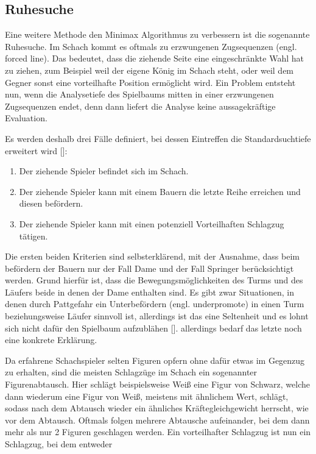 \subsection{Ruhesuche}

Eine weitere Methode den Minimax Algorithmus zu verbessern ist die sogenannte Ruhesuche.
Im Schach kommt es oftmals zu erzwungenen Zugsequenzen (engl. forced line).
Das bedeutet, dass die ziehende Seite eine eingeschränkte Wahl hat zu ziehen, zum Beispiel weil der eigene König im Schach steht, oder weil dem Gegner sonst eine vorteilhafte Position ermöglicht wird.
Ein Problem entsteht nun, wenn die Analysetiefe des Spielbaums mitten in einer erzwungenen Zugsequenzen endet, denn dann liefert die Analyse keine aussagekräftige Evaluation.

Es werden deshalb drei Fälle definiert, bei dessen Eintreffen die Standardsuchtiefe erweitert wird [\cite{Stuckardt}]:

\begin{enumerate}
    \item Der ziehende Spieler befindet sich im Schach.
    \item Der ziehende Spieler kann mit einem Bauern die letzte Reihe erreichen und diesen befördern.
    \item Der ziehende Spieler kann mit einen potenziell Vorteilhaften Schlagzug tätigen.
\end{enumerate}

Die ersten beiden Kriterien sind selbsterklärend, mit der Ausnahme, dass beim befördern der Bauern nur der Fall Dame und der Fall Springer berücksichtigt werden.
Grund hierfür ist, dass die Bewegungsmöglichkeiten des Turms und des Läufers beide in denen der Dame enthalten sind.
Es gibt zwar Situationen, in denen durch Pattgefahr ein Unterbefördern (engl. underpromote) in einen Turm beziehungsweise Läufer sinnvoll ist, allerdings ist das eine Seltenheit und es lohnt sich nicht dafür den Spielbaum aufzublähen [\cite{Stuckardt}].
allerdings bedarf das letzte noch eine konkrete Erklärung.

Da erfahrene Schachspieler selten Figuren opfern ohne dafür etwas im Gegenzug zu erhalten, sind die meisten Schlagzüge im Schach ein sogenannter Figurenabtausch.
Hier schlägt beispielsweise Weiß eine Figur von Schwarz, welche dann wiederum eine Figur von Weiß, meistens mit ähnlichem Wert, schlägt, sodass nach dem Abtausch wieder ein ähnliches Kräftegleichgewicht herrscht, wie vor dem Abtausch.
Oftmals folgen mehrere Abtausche aufeinander, bei dem dann mehr als nur 2 Figuren geschlagen werden.
Ein vorteilhafter Schlagzug ist nun ein Schlagzug, bei dem entweder

